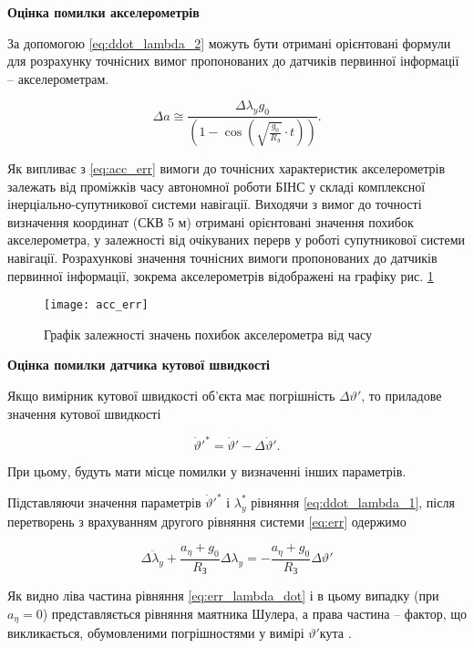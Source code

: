 \textbf{Оцінка помилки акселерометрів}

За допомогою \eqref{eq:ddot_lambda_2} можуть бути отримані орієнтовані формули для розрахунку точнісних вимог пропонованих до датчиків первинної 
інформації -- акселерометрам.

\begin{equation} 
\label{eq:acc_err} 
\Delta a\cong \frac{\Delta \lambda _{y} g_{0} }{\left(1-\cos \left(\sqrt{\frac{g_{0} }{R_{{\text{З}}} } } \cdot t\right)\right)}.    
\end{equation} 

Як випливає з \eqref{eq:acc_err} вимоги до точнісних характеристик акселерометрів залежать від проміжків часу 
автономної роботи БІНС у складі комплексної інерціально-супутникової системи навігації. Виходячи з вимог до 
точності визначення координат (СКВ  5 м) отримані орієнтовані значення похибок акселерометра, у залежності 
від очікуваних перерв у роботі супутникової системи навігації. Розрахункові значення точнісних вимоги 
пропонованих до датчиків первинної інформації, зокрема акселерометрів відображені на графіку рис. \ref{fig:acc_err} 

\begin{figure}
\centering
\texttt{[image: acc\_err]}
\caption{Графік залежності значень похибок акселерометра від часу}
\label{fig:acc_err}
\end{figure} 
\vline 

\textbf{Оцінка помилки датчика кутової швидкості}

Якщо вимірник кутової швидкості об'єкта має погрішність $\Delta \vartheta '$, то приладове значення кутової швидкості

\[\dot{\vartheta }'^{*} =\dot{\vartheta }'-\Delta \dot{\vartheta }'.\] 

При цьому, будуть мати місце помилки у визначенні інших параметрів.

Підставляючи значення параметрів $\dot{\vartheta }'^{*} $ і  $\lambda _{y}^{*} $ рівняння \eqref{eq:ddot_lambda_1},  
після перетворень з врахуванням другого рівняння системи \eqref{eq:err} одержимо

\begin{equation} 
\label{eq:err_lambda_dot} 
\Delta \ddot{\lambda }_{y} +\frac{a_{\eta } +g_{0} }{R_{\text{З}} } \Delta \lambda _{y} =-\frac{a_{\eta } +g_{0} }{R_{\text{З}} } \Delta \vartheta ' 
\end{equation} 

Як видно ліва частина рівняння \eqref{eq:err_lambda_dot} і в цьому випадку (при $a_{\eta } =0$) представляється рівняння 
маятника Шулера, а права частина -- фактор, що викликається, обумовленими погрішностями у вимірі $\vartheta '$кута .

